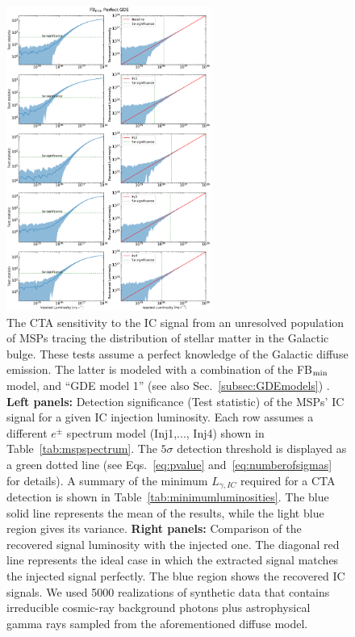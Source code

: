 \documentclass[doublespace,nopageskip]{VTthesis}
\begin{document}
\begin{figure}
    \centering
    \includegraphics[width=0.6\textwidth]{Figures/CTA/all-TS-mis-False-Fermi-min-True.pdf}
    \caption{The CTA sensitivity to the IC signal from an unresolved population of MSPs tracing the distribution of stellar matter in the Galactic bulge. These tests assume a perfect knowledge of the Galactic diffuse emission. The latter is modeled with a combination of the FB$_{\rm min}$ model, and ``GDE model 1'' (see also Sec.~\ref{subsec:GDEmodels})  
    . \textbf{Left panels:} Detection significance (Test statistic) of the MSPs' IC signal for a given IC injection luminosity. Each row assumes a different $e^\pm$ spectrum model (Inj1,..., Inj4) shown in Table~\ref{tab:mspspectrum}. The $5\sigma$ detection threshold is displayed as a green dotted line (see Eqs.~\ref{eq:pvalue} and~\ref{eq:numberofsigmas} for details). A summary of the minimum $L_{\gamma,IC}$ required for a CTA detection is shown in Table~\ref{tab:minimumluminosities}.  The blue solid line represents the mean of the results, while the light blue region gives its variance. \textbf{Right panels:} Comparison of the recovered signal luminosity with the injected one. The diagonal red line represents the ideal case in which the extracted signal matches the injected signal perfectly. The blue region shows the recovered IC signals. We used  5000 realizations of synthetic data that contains irreducible cosmic-ray background photons plus astrophysical gamma rays sampled from the aforementioned diffuse model. 
    }
    \label{fig:Injection_perfectGDE}
\end{figure}
\end{document}

